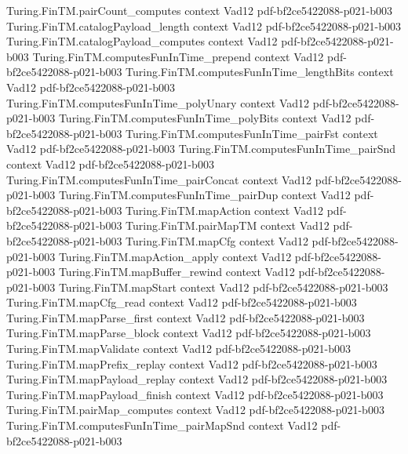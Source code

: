 \begin{theorem}
\proofstep
  {Turing.FinTM.pairCount_computes}
  {context}
  {Vad12}
  {pdf-bf2ce5422088-p021-b003}
\proofstep
  {Turing.FinTM.catalogPayload_length}
  {context}
  {Vad12}
  {pdf-bf2ce5422088-p021-b003}
\proofstep
  {Turing.FinTM.catalogPayload_computes}
  {context}
  {Vad12}
  {pdf-bf2ce5422088-p021-b003}
\proofstep
  {Turing.FinTM.computesFunInTime_prepend}
  {context}
  {Vad12}
  {pdf-bf2ce5422088-p021-b003}
\proofstep
  {Turing.FinTM.computesFunInTime_lengthBits}
  {context}
  {Vad12}
  {pdf-bf2ce5422088-p021-b003}
\proofstep
  {Turing.FinTM.computesFunInTime_polyUnary}
  {context}
  {Vad12}
  {pdf-bf2ce5422088-p021-b003}
\proofstep
  {Turing.FinTM.computesFunInTime_polyBits}
  {context}
  {Vad12}
  {pdf-bf2ce5422088-p021-b003}
\proofstep
  {Turing.FinTM.computesFunInTime_pairFst}
  {context}
  {Vad12}
  {pdf-bf2ce5422088-p021-b003}
\proofstep
  {Turing.FinTM.computesFunInTime_pairSnd}
  {context}
  {Vad12}
  {pdf-bf2ce5422088-p021-b003}
\proofstep
  {Turing.FinTM.computesFunInTime_pairConcat}
  {context}
  {Vad12}
  {pdf-bf2ce5422088-p021-b003}
\proofstep
  {Turing.FinTM.computesFunInTime_pairDup}
  {context}
  {Vad12}
  {pdf-bf2ce5422088-p021-b003}
\proofstep
  {Turing.FinTM.mapAction}
  {context}
  {Vad12}
  {pdf-bf2ce5422088-p021-b003}
\proofstep
  {Turing.FinTM.pairMapTM}
  {context}
  {Vad12}
  {pdf-bf2ce5422088-p021-b003}
\proofstep
  {Turing.FinTM.mapCfg}
  {context}
  {Vad12}
  {pdf-bf2ce5422088-p021-b003}
\proofstep
  {Turing.FinTM.mapAction_apply}
  {context}
  {Vad12}
  {pdf-bf2ce5422088-p021-b003}
\proofstep
  {Turing.FinTM.mapBuffer_rewind}
  {context}
  {Vad12}
  {pdf-bf2ce5422088-p021-b003}
\proofstep
  {Turing.FinTM.mapStart}
  {context}
  {Vad12}
  {pdf-bf2ce5422088-p021-b003}
\proofstep
  {Turing.FinTM.mapCfg_read}
  {context}
  {Vad12}
  {pdf-bf2ce5422088-p021-b003}
\proofstep
  {Turing.FinTM.mapParse_first}
  {context}
  {Vad12}
  {pdf-bf2ce5422088-p021-b003}
\proofstep
  {Turing.FinTM.mapParse_block}
  {context}
  {Vad12}
  {pdf-bf2ce5422088-p021-b003}
\proofstep
  {Turing.FinTM.mapValidate}
  {context}
  {Vad12}
  {pdf-bf2ce5422088-p021-b003}
\proofstep
  {Turing.FinTM.mapPrefix_replay}
  {context}
  {Vad12}
  {pdf-bf2ce5422088-p021-b003}
\proofstep
  {Turing.FinTM.mapPayload_replay}
  {context}
  {Vad12}
  {pdf-bf2ce5422088-p021-b003}
\proofstep
  {Turing.FinTM.mapPayload_finish}
  {context}
  {Vad12}
  {pdf-bf2ce5422088-p021-b003}
\proofstep
  {Turing.FinTM.pairMap_computes}
  {context}
  {Vad12}
  {pdf-bf2ce5422088-p021-b003}
\proofstep
  {Turing.FinTM.computesFunInTime_pairMapSnd}
  {context}
  {Vad12}
  {pdf-bf2ce5422088-p021-b003}

\end{theorem}
